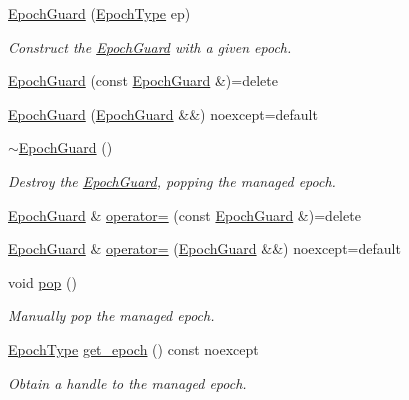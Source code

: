 \begin{DoxyCompactItemize}
\item 
\hyperlink{structvt_1_1_epoch_guard_a89230b0cb27404fe74fd19ba667c54dc}{Epoch\+Guard} (\hyperlink{namespacevt_a81d11b28122d43bf9834577e4a06440f}{Epoch\+Type} ep)
\begin{DoxyCompactList}\small\item\em Construct the \hyperlink{structvt_1_1_epoch_guard}{Epoch\+Guard} with a given epoch. \end{DoxyCompactList}\item 
\hyperlink{structvt_1_1_epoch_guard_a04f94ad13c6c3e709427adea95293ab6}{Epoch\+Guard} (const \hyperlink{structvt_1_1_epoch_guard}{Epoch\+Guard} \&)=delete
\item 
\hyperlink{structvt_1_1_epoch_guard_a0a59db6f3b1d71c397f64a37ed43fd40}{Epoch\+Guard} (\hyperlink{structvt_1_1_epoch_guard}{Epoch\+Guard} \&\&) noexcept=default
\item 
\hyperlink{structvt_1_1_epoch_guard_adf6677491e5d70a81645216b3cb65d0a}{$\sim$\+Epoch\+Guard} ()
\begin{DoxyCompactList}\small\item\em Destroy the \hyperlink{structvt_1_1_epoch_guard}{Epoch\+Guard}, popping the managed epoch. \end{DoxyCompactList}\item 
\hyperlink{structvt_1_1_epoch_guard}{Epoch\+Guard} \& \hyperlink{structvt_1_1_epoch_guard_adc52bcc301ca61c7cf3d52c725345ee6}{operator=} (const \hyperlink{structvt_1_1_epoch_guard}{Epoch\+Guard} \&)=delete
\item 
\hyperlink{structvt_1_1_epoch_guard}{Epoch\+Guard} \& \hyperlink{structvt_1_1_epoch_guard_aac8048b562920e1628ee5020d0e29da4}{operator=} (\hyperlink{structvt_1_1_epoch_guard}{Epoch\+Guard} \&\&) noexcept=default
\item 
void \hyperlink{structvt_1_1_epoch_guard_aa0106927b2e50b4be20bee542d264dba}{pop} ()
\begin{DoxyCompactList}\small\item\em Manually pop the managed epoch. \end{DoxyCompactList}\item 
\hyperlink{namespacevt_a81d11b28122d43bf9834577e4a06440f}{Epoch\+Type} \hyperlink{structvt_1_1_epoch_guard_a41d2d7190be38fe256d6d8476a1f460e}{get\+\_\+epoch} () const noexcept
\begin{DoxyCompactList}\small\item\em Obtain a handle to the managed epoch. \end{DoxyCompactList}\end{DoxyCompactItemize}
